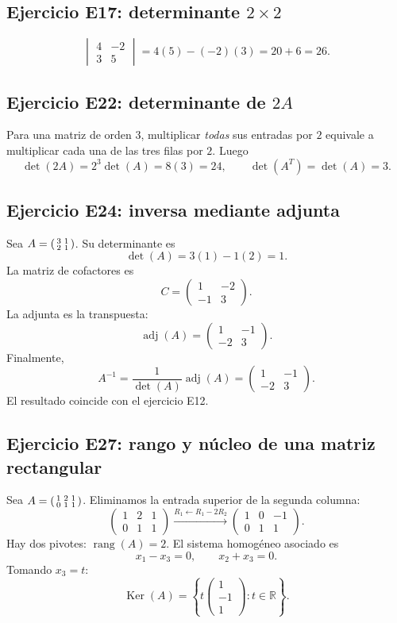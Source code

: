 \documentclass[12pt]{article}
\theoremstyle{remark}
\newcommand{\R}{\mathbb{R}}
\newcommand{\rang}{\operatorname{rang}}
\newcommand{\adj}{\operatorname{adj}}
\newcommand{\Ker}{\operatorname{Ker}}
\begin{document}
\subsection*{Ejercicio E17: determinante $2\times2$}
\[
\begin{vmatrix}4&-2\\3&5\end{vmatrix}=4(5)-(-2)(3)=20+6=\boxed{26}.
\]

\subsection*{Ejercicio E22: determinante de $2A$}
Para una matriz de orden $3$, multiplicar \emph{todas} sus entradas por $2$ equivale a multiplicar cada una de las tres filas por $2$. Luego
\[
\det(2A)=2^3\det(A)=8(3)=\boxed{24},\qquad
\det(A^T)=\det(A)=\boxed{3}.
\]

\subsection*{Ejercicio E24: inversa mediante adjunta}
Sea $A=\begin{psmallmatrix}3&1\\2&1\end{psmallmatrix}$. Su determinante es
\[
\det(A)=3(1)-1(2)=1.
\]
La matriz de cofactores es
\[
C=\begin{pmatrix}1&-2\\-1&3\end{pmatrix}.
\]
La adjunta es la transpuesta:
\[
\adj(A)=\begin{pmatrix}1&-1\\-2&3\end{pmatrix}.
\]
Finalmente,
\[
\boxed{A^{-1}=\frac{1}{\det(A)}\adj(A)
=\begin{pmatrix}1&-1\\-2&3\end{pmatrix}.}
\]
El resultado coincide con el ejercicio E12.

\subsection*{Ejercicio E27: rango y núcleo de una matriz rectangular}
Sea $A=\begin{psmallmatrix}1&2&1\\0&1&1\end{psmallmatrix}$. Eliminamos la entrada superior de la segunda columna:
\[
\begin{pmatrix}1&2&1\\0&1&1\end{pmatrix}
\xrightarrow{R_1\leftarrow R_1-2R_2}
\begin{pmatrix}1&0&-1\\0&1&1\end{pmatrix}.
\]
Hay dos pivotes: $\boxed{\rang(A)=2}$. El sistema homogéneo asociado es
\[
x_1-x_3=0,\qquad x_2+x_3=0.
\]
Tomando $x_3=t$:
\[
\boxed{\Ker(A)=\left\{t\begin{pmatrix}1\\-1\\1\end{pmatrix}:t\in\R\right\}.}
\]
\end{document}
